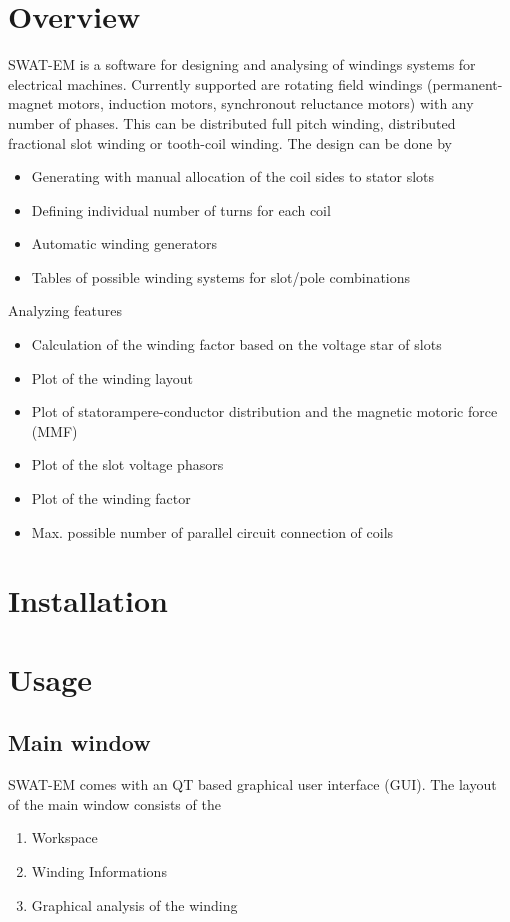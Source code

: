 \documentclass[]{scrreprt}
\begin{document}
\chapter{Overview}
SWAT-EM is a software for designing and analysing of windings systems for electrical machines. Currently supported are rotating field windings (permanent-magnet motors, induction motors, synchronout reluctance motors) with any number of phases. This can be distributed full pitch winding, distributed fractional slot winding or tooth-coil winding. The design can be done by 
\begin{itemize}
 \item Generating with manual allocation of the coil sides to stator slots
 \item Defining individual number of turns for each coil
 \item Automatic winding generators
 \item Tables of possible winding systems for slot/pole combinations
\end{itemize}
% 
% 
% 
Analyzing features
\begin{itemize}
\item Calculation of the winding factor based on the voltage star of slots
\item Plot of the winding layout
\item Plot of statorampere-conductor distribution and the magnetic motoric force (MMF)
\item Plot of the slot voltage phasors
\item Plot of the winding factor
\item Max. possible number of parallel circuit connection of coils

\end{itemize}




\chapter{Installation}

\chapter{Usage}

\section{Main window}
%
SWAT-EM comes with an QT based graphical user interface (GUI). The layout of the main window consists of the
\begin{enumerate}
 \item Workspace
 \item Winding Informations
 \item Graphical analysis of the winding
\end{enumerate}
\end{document}
